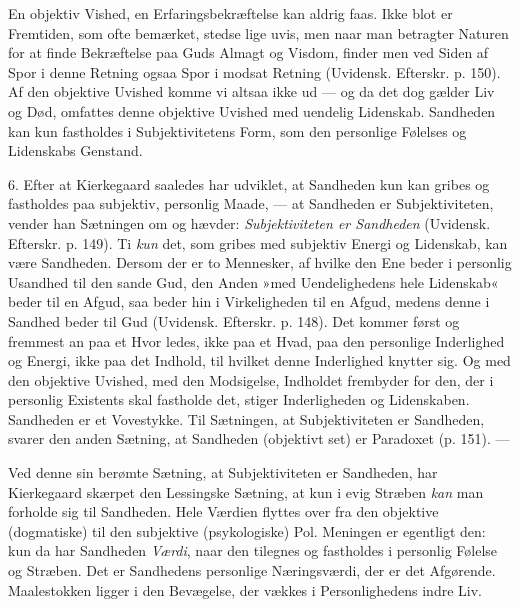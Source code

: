 \documentclass[12pt,a4paper,openany]{book}
\newcommand{\opage}[1]{\marginnote{\footnotesize\textit{[#1]}}}
\begin{document}
En objektiv Vished, en Erfaringsbekræftelse kan
aldrig faas. Ikke blot er Fremtiden, som ofte bemærket,
stedse lige uvis, men naar man betragter Naturen for at
finde Bekræftelse paa Guds Almagt og Visdom, finder
men ved Siden af Spor i denne Retning ogsaa Spor i
modsat Retning (Uvidensk. Efterskr. p. 150). Af den
objektive Uvished komme vi altsaa ikke ud --- og da det
dog gælder Liv og Død, omfattes denne objektive Uvished
med uendelig Lidenskab. Sandheden kan kun fastholdes
i Subjektivitetens Form, som den personlige
Følelses og Lidenskabs Genstand.

6. Efter at Kierkegaard saaledes har udviklet, at
Sandheden kun kan gribes og fastholdes paa subjektiv,
personlig Maade, --- at Sandheden er Subjektiviteten,
vender han Sætningen om og hævder: \textit{Subjektiviteten er
Sandheden} (Uvidensk. Efterskr. p. 149). Ti \textit{kun} det, som
gribes med subjektiv Energi og Lidenskab, kan være
Sandheden. Dersom der er to Mennesker, af hvilke
den Ene beder i personlig Usandhed til den sande Gud,
den Anden »med Uendelighedens hele Lidenskab« beder
til en Afgud, saa beder hin i Virkeligheden til en Afgud,
medens denne i Sandhed beder til Gud (Uvidensk. Efterskr.
p. 148). Det kommer først og fremmest an paa et Hvor%
\opage{68}ledes, ikke paa et Hvad, paa den personlige Inderlighed
og Energi, ikke paa det Indhold, til hvilket denne Inderlighed
knytter sig. Og med den objektive Uvished, med
den Modsigelse, Indholdet frembyder for den, der i personlig
Existents skal fastholde det, stiger Inderligheden
og Lidenskaben. Sandheden er et Vovestykke. Til Sætningen,
at Subjektiviteten er Sandheden, svarer den anden
Sætning, at Sandheden (objektivt set) er Paradoxet
(p. 151). ---

Ved denne sin berømte Sætning, at Subjektiviteten
er Sandheden, har Kierkegaard skærpet den Lessingske
Sætning, at kun i evig Stræben \textit{kan} man forholde sig til
Sandheden. Hele Værdien flyttes over fra den objektive
(dogmatiske) til den subjektive (psykologiske) Pol. Meningen
er egentligt den: kun da har Sandheden \textit{Værdi},
naar den tilegnes og fastholdes i personlig Følelse og
Stræben. Det er Sandhedens personlige Næringsværdi,
der er det Afgørende. Maalestokken ligger i den Bevægelse,
der vækkes i Personlighedens indre Liv.
\end{document}
